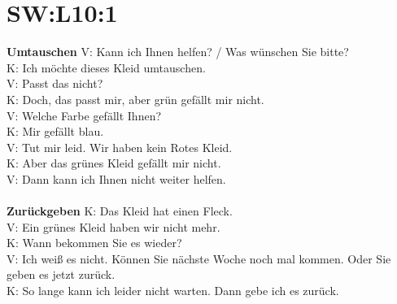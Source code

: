 \section{SW:L10:1}
\noindent
\textbf{Umtauschen}
V: Kann ich Ihnen helfen? / Was wünschen Sie bitte? \\
K: Ich möchte dieses Kleid umtauschen.  \\
V: Passt das nicht? \\
K: Doch, das passt mir, aber grün gefällt mir nicht. \\
V: Welche Farbe gefällt Ihnen? \\
K: Mir gefällt blau. \\
V: Tut mir leid. Wir haben kein Rotes Kleid. \\
K: Aber das grünes Kleid gefällt mir nicht. \\
V: Dann kann ich Ihnen nicht weiter helfen. \\
\\
\noindent
\textbf{Zurückgeben}
K: Das Kleid hat einen Fleck.  \\
V: Ein grünes Kleid haben wir nicht mehr. \\
K: Wann bekommen Sie es wieder? \\
V: Ich weiß es nicht. Können Sie nächste Woche noch mal kommen. Oder Sie geben es jetzt zurück.  \\
K: So lange kann ich leider nicht warten. Dann gebe ich es zurück. \\

